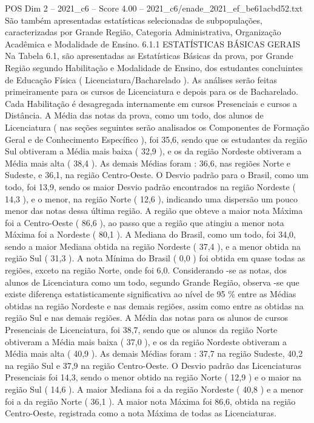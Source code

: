 \begin{textsample}{POS Dim 2 – 2021\_c6 – Score 4.00 – 2021\_c6/enade\_2021\_ef\_be61acbd52.txt}
São também apresentadas estatísticas selecionadas de subpopulações, caracterizadas por Grande Região, Categoria Administrativa, Organização Acadêmica e Modalidade de Ensino. 6.1.1 ESTATÍSTICAS BÁSICAS GERAIS Na Tabela 6.1, são apresentadas as Estatísticas Básicas da prova, por Grande Região segundo Habilitação e Modalidade de Ensino, dos estudantes concluintes de Educação Física ( Licenciatura/Bacharelado ).
As análises serão feitas primeiramente para os cursos de Licenciatura e depois para os de Bacharelado.
Cada Habilitação é desagregada internamente em cursos Presenciais e cursos a Distância.
A Média das notas da prova, como um todo, dos alunos de Licenciatura ( nas seções seguintes serão analisados os Componentes de Formação Geral e de Conhecimento Específico ), foi 35,6, sendo que os estudantes da região Sul obtiveram a Média mais baixa ( 32,9 ), e os da região Nordeste obtiveram a Média mais alta ( 38,4 ).
As demais Médias foram : 36,6, nas regiões Norte e Sudeste, e 36,1, na região Centro-Oeste.
O Desvio padrão para o Brasil, como um todo, foi 13,9, sendo os maior Desvio padrão encontrados na região Nordeste ( 14,3 ), e o menor, na região Norte ( 12,6 ), indicando uma dispersão um pouco menor das notas dessa última região.
A região que obteve a maior nota Máxima foi a Centro-Oeste ( 86,6 ), ao passo que a região que atingiu a menor nota Máxima foi a Nordeste ( 80,1 ).
A Mediana do Brasil, como um todo, foi 34,0, sendo a maior Mediana obtida na região Nordeste ( 37,4 ), e a menor obtida na região Sul ( 31,3 ).
A nota Mínima do Brasil ( 0,0 ) foi obtida em quase todas as regiões, exceto na região Norte, onde foi 6,0.
Considerando -se as notas, dos alunos de Licenciatura como um todo, segundo Grande Região, observa -se que existe diferença estatisticamente significativa ao nível de 95 \% entre as Médias obtidas na região Nordeste e nas demais regiões, assim como entre as obtidas na região Sul e nas demais regiões.
A Média das notas para os alunos de cursos Presenciais de Licenciatura, foi 38,7, sendo que os alunos da região Norte obtiveram a Média mais baixa ( 37,0 ), e os da região Nordeste obtiveram a Média mais alta ( 40,9 ).
As demais Médias foram : 37,7 na região Sudeste, 40,2 na região Sul e 37,9 na região Centro-Oeste.
O Desvio padrão das Licenciaturas Presenciais foi 14,3, sendo o menor obtido na região Norte ( 12,9 ) e o maior na região Sul ( 14,6 ).
A maior Mediana foi a da região Nordeste ( 40,8 ) e a menor foi a da região Norte ( 36,1 ).
A maior nota Máxima foi 86,6, obtida na região Centro-Oeste, registrada como a nota Máxima de todas as Licenciaturas.

\end{textsample}
